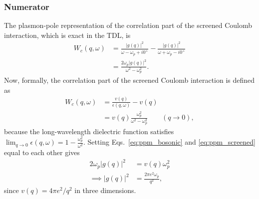 \subsubsection{Numerator}
The plasmon-pole representation of the
correlation part of the screened Coulomb interaction, which is exact in the TDL, is
\begin{align}
W_c(q,\omega)
&=
\frac{|g(q)|^2}
{\omega-\omega_p+i0^+}
-
\frac{|g(q)|^2}
{\omega+\omega_p-i0^+}\\
&=
\frac{
2\omega_p |g(q)|^2
}{
\omega^2-\omega_p^2
}.
\label{eq:ppm_bosonic}
\end{align}
Now, formally, the correlation part of the screened Coulomb interaction is defined as
\begin{align}
W_c(q,\omega)
&=
\frac{v(q)}{\epsilon(q,\omega)}-v(q)
\nonumber\\
&=
v(q)
\frac{\omega_p^2}
{\omega^2-\omega_p^2}
\qquad
(q\rightarrow0),
\label{eq:ppm_screened}
\end{align}
because the long-wavelength dielectric function satisfies
$
\lim_{q\rightarrow0}
\epsilon(q,\omega)=
1-\frac{\omega_p^2}{\omega^2}.
$
Setting Eqs.~\eqref{eq:ppm_bosonic} and
\eqref{eq:ppm_screened} equal to each other gives
\begin{align}
2\omega_p|g(q)|^2
&=
v(q)\omega_p^2 \\
\implies |g(q)|^2
&=
\frac{2\pi e^2\omega_p}{q^2},
\label{eq:g_long_wavelength}
\end{align}
since $v(q)=4\pi e^2/q^2$ in three dimensions.

